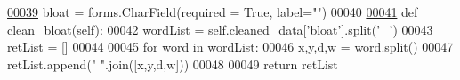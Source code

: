 \begin{DoxyCode}
\hypertarget{Course_2forms_8py_source_l00039}{}\hyperlink{classCourse_1_1forms_1_1CrossWordExercise_aa9c9a8c4547386d9e9d9830289e8bd9e}{00039}     bloat = forms.CharField(required = \textcolor{keyword}{True}, label=\textcolor{stringliteral}{""})
00040 
\hypertarget{Course_2forms_8py_source_l00041}{}\hyperlink{classCourse_1_1forms_1_1CrossWordExercise_a2e3c06f2bc9b11dd04df1da8825f777b}{00041}     \textcolor{keyword}{def }\hyperlink{classCourse_1_1forms_1_1CrossWordExercise_a2e3c06f2bc9b11dd04df1da8825f777b}{clean\_bloat}(self):
00042         wordList = self.cleaned\_data[\textcolor{stringliteral}{'bloat'}].split(\textcolor{stringliteral}{'\_'})
00043         retList = []
00044 
00045         \textcolor{keywordflow}{for} word \textcolor{keywordflow}{in} wordList:
00046             x,y,d,w = word.split()
00047             retList.append(\textcolor{stringliteral}{" "}.join([x,y,d,w]))
00048 
00049         \textcolor{keywordflow}{return} retList
\end{DoxyCode}
